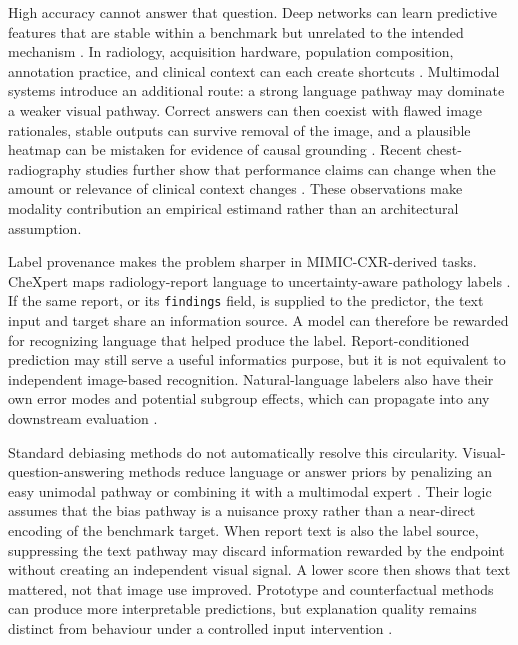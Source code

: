 \documentclass[a4paper,fleqn]{cas-sc}
\begin{document}
High accuracy cannot answer that question. Deep networks can learn predictive
features that are stable within a benchmark but unrelated to the intended
mechanism \cite{geirhos2020shortcut}. In radiology, acquisition hardware,
population composition, annotation practice, and clinical context can each
create shortcuts \cite{gichoya2023shortcuts}. Multimodal systems introduce an
additional route: a strong language pathway may dominate a weaker visual
pathway. Correct answers can then coexist with flawed image rationales, stable
outputs can survive removal of the image, and a plausible heatmap can be
mistaken for evidence of causal grounding
\cite{jin2024hiddenflaws,lotfinia2026needimage,sadanandan2026consistentdangerous}.
Recent chest-radiography studies further show that performance claims can change
when the amount or relevance of clinical context changes
\cite{wang2026clinicalcontext}. These observations make modality contribution
an empirical estimand rather than an architectural assumption.

Label provenance makes the problem sharper in MIMIC-CXR-derived tasks. CheXpert
maps radiology-report language to uncertainty-aware pathology labels
\cite{irvin2019chexpert}. If the same report, or its \texttt{findings} field,
is supplied to the predictor, the text input and target share an information
source. A model can therefore be rewarded for recognizing language that helped
produce the label. Report-conditioned prediction may still serve a useful
informatics purpose, but it is not equivalent to independent image-based
recognition. Natural-language labelers also have their own error modes and
potential subgroup effects, which can propagate into any downstream evaluation
\cite{sabottke2024targetselection,santomartino2024nlplabeling}.

Standard debiasing methods do not automatically resolve this circularity.
Visual-question-answering methods reduce language or answer priors by
penalizing an easy unimodal pathway or combining it with a multimodal expert
\cite{agrawal2018dontassume,clark2019easyway,cadene2019rubi}. Their logic assumes
that the bias pathway is a nuisance proxy rather than a near-direct encoding of
the benchmark target. When report text is also the label source, suppressing the
text pathway may discard information rewarded by the endpoint without creating
an independent visual signal. A lower score then shows that text mattered, not
that image use improved. Prototype and counterfactual methods can produce more
interpretable predictions, but explanation quality remains distinct from
behaviour under a controlled input intervention \cite{chiang2026cxrnexus}.
\end{document}
